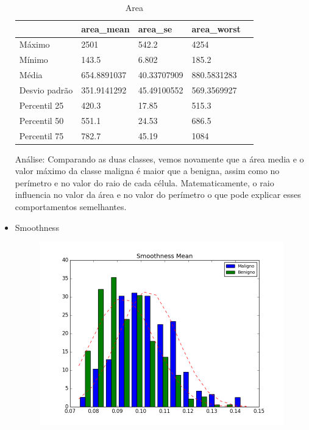 \documentclass[11pt,a4paper]{article}
\numberwithin{equation}{section}
\begin{document}
\begin{itemize}
\begin{table}[H]
\centering
\caption{Area}
\label{my-label}
\begin{tabular}{lllll} \hline
              & area\_mean  & area\_se    & area\_worst &  \\ \hline
Máximo        & 2501        & 542.2       & 4254        &  \\
Mínimo        & 143.5       & 6.802       & 185.2       &  \\
Média         & 654.8891037 & 40.33707909 & 880.5831283 &  \\
Desvio padrão & 351.9141292 & 45.49100552 & 569.3569927 &  \\
Percentil 25  & 420.3       & 17.85       & 515.3       &  \\
Percentil 50  & 551.1       & 24.53       & 686.5       &  \\
Percentil 75  & 782.7       & 45.19       & 1084        &  \\ \hline
\end{tabular}
\end{table}

Análise: Comparando as duas classes, vemos novamente que a área media e o valor máximo da classe maligna é maior que a benigna, assim como no perímetro e no valor do raio de cada célula. Matematicamente, o raio influencia no valor da área e no valor do perímetro o que pode explicar esses comportamentos semelhantes.  


\item Smoothness
\begin{figure}[H]
\centering
  \includegraphics[width=.5\linewidth]{../img/hist/smoothness_mean}
  \label{fig:test1}
\end{figure}%


\end{itemize}
\end{document}
